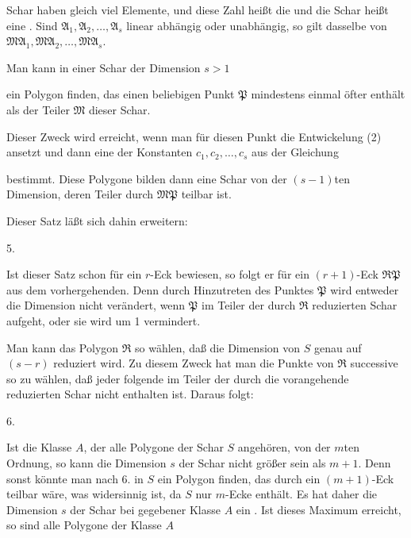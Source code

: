 
Schar haben gleich viel Elemente, und diese Zahl heißt die
 und die Schar heißt eine .
Sind $\mathfrak{A}_1, \mathfrak{A}_2, \ldots, \mathfrak{A}_s$ linear abhängig oder unabhängig, so gilt
dasselbe von $\mathfrak{M}\mathfrak{A}_1, \mathfrak{M}\mathfrak{A}_2, \ldots, \mathfrak{M}\mathfrak{A}_s$.

Man kann in einer Schar der Dimension $s > 1$


ein Polygon finden, das einen beliebigen Punkt $\mathfrak{P}$ mindestens
einmal öfter enthält als der Teiler $\mathfrak{M}$ dieser Schar.

Dieser Zweck wird erreicht, wenn man für diesen Punkt die
Entwickelung (2) ansetzt und dann eine der Konstanten $c_1, c_2, \ldots, c_s$
aus der Gleichung


bestimmt. Diese Polygone bilden dann eine Schar von der $(s-1)$ten
Dimension, deren Teiler durch $\mathfrak{M}\mathfrak{P}$ teilbar ist.

Dieser Satz läßt sich dahin erweitern:

5. 

Ist dieser Satz schon für ein $r$-Eck bewiesen, so folgt er
für ein $(r+1)$-Eck $\mathfrak{R}\mathfrak{P}$ aus dem vorhergehenden.
Denn durch
Hinzutreten des Punktes $\mathfrak{P}$ wird entweder die Dimension nicht
verändert, wenn $\mathfrak{P}$ im Teiler der durch $\mathfrak{R}$ reduzierten Schar aufgeht,
oder sie wird um 1 vermindert.

Man kann das Polygon $\mathfrak{R}$ so wählen, daß die Dimension von
$S$ genau auf $(s-r)$ reduziert wird. Zu diesem Zweck hat man
die Punkte von $\mathfrak{R}$ successive so zu wählen, daß jeder folgende
im Teiler der durch die vorangehende reduzierten Schar nicht
enthalten ist. Daraus folgt:

6. 

Ist die Klasse $A$, der alle Polygone der Schar $S$ angehören,
von der $m$ten Ordnung, so kann die Dimension $s$ der Schar nicht
größer sein als $m+1$. Denn sonst könnte man nach 6. in
$S$ ein Polygon finden, das durch ein $(m+1)$-Eck teilbar wäre,
was widersinnig ist, da $S$ nur $m$-Ecke enthält. Es hat daher die
Dimension $s$ der Schar bei gegebener Klasse $A$ ein .
Ist dieses Maximum erreicht, so sind alle Polygone der Klasse $A$
